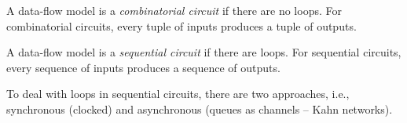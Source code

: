\begin{definition}
	A data-flow model is a \emph{combinatorial circuit} if there are no loops.
	For combinatorial circuits, every tuple of inputs produces a tuple of outputs.
\end{definition}

\begin{definition} 
	A data-flow model is a \emph{sequential circuit} if there are loops.
	For sequential circuits, every sequence of inputs produces a sequence of outputs.
\end{definition}

\begin{remark}
    To deal with loops in sequential circuits, there are two approaches, i.e., 
    synchronous (clocked) and asynchronous (queues as channels -- Kahn networks).
\end{remark}


